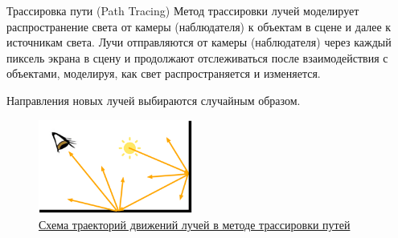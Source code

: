 \documentclass{beamer}
\begin{document}
	\begin{frame}{Трассировка пути (Path Tracing)}
		\footnotesize
		Метод трассировки лучей моделирует распространение света от камеры (наблюдателя) к объектам в сцене и далее к источникам света. 
		Лучи отправляются от камеры (наблюдателя) через каждый пиксель экрана в сцену и 
		продолжают отслеживаться после взаимодействия с объектами, моделируя, как свет распространяется и изменяется.
		
		Направления новых лучей выбираются случайным образом.

		\begin{figure}
			\includegraphics[width=0.45\textwidth]{images/path-tracing.png}
			\caption{
				\href{https://www.scratchapixel.com/lessons/3d-basic-rendering/global-illumination-path-tracing/introduction-global-illumination-path-tracing.html}{Схема траекторий движений лучей в методе трассировки путей}
			}
		\end{figure}



	\end{frame}
\end{document}
